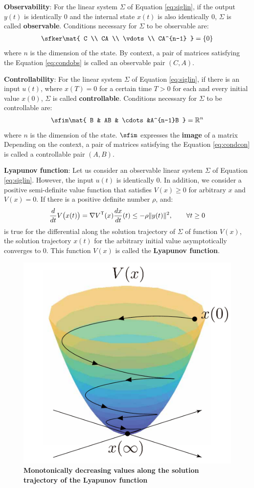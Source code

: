 \documentclass[graybox, envcountchap]{svmult}
\begin{document}
\begin{COLUMN}
\noindent \textbf{Observability}:
For the linear system $\Sigma$ of Equation \ref{eq:siglin}, if the output $y(t)$ is identically 0 and the internal state $x(t)$ is also identically 0, $\Sigma$ is called \textbf{observable}.
Conditions necessary for $\Sigma$ to be observable are:
\begin{align}\label{eq:condobs}
\sfker \mat{
C \\
CA \\
\vdots \\
CA^{n-1}
}
=\{0\}
\end{align}
where $n$ is the dimension of the state.
By context, a pair of matrices satisfying the Equation \ref{eq:condobs} is called an observable pair $(C,A)$.

\smallskip
\noindent \textbf{Controllability}:
For the linear system $\Sigma$ of Equation \ref{eq:siglin}, if there is an input $u(t)$, where $x(T) = 0$ for a certain time $T > 0$ for each and every initial value $x(0)$, $\Sigma$ is called \textbf{controllable}.
Conditions necessary for $\Sigma$ to be controllable are:
\begin{align}\label{eq:condcon}
\sfim \mat{
B & AB & \cdots &A^{n-1}B
}
= \mathbb{R}^n
\end{align}
where $n$ is the dimension of the state. $\sfim$ expresses the \textbf{image} of a matrix
Depending on the context, a pair of matrices satisfying the Equation \ref{eq:condcon} is called a controllable pair $(A,B)$.

\smallskip
\noindent \textbf{Lyapunov function}:
Let us consider an observable linear system $\Sigma$ of Equation
\ref{eq:siglin}. However, the input $u(t)$ is identically 0. In addition, we
consider a positive semi-definite value function that satisfies $V(x)\geq0$ for
arbitrary $x$ and $V(x)=0$. If there is a positive definite number $\rho$, and:
\[
\frac{d}{dt} V \bigl( x (t) \bigr) 
=
\nabla V^{\sf T}(x) \frac{d x}{dt} (t)
\leq  - \rho \|y(t)\|^2,\qquad
\forall t \geq0
\]
is true for the differential along the solution trajectory of $\Sigma$ of function $V(x)$, the solution trajectory $x(t)$ for the arbitrary initial value asymptotically converges to 0.
This function $V(x)$ is called the \textbf{Lyapunov function}.

\begin{figure}[h]
\centering
\includegraphics[width = .35\linewidth]{figs/cone}
\caption{\textbf{Monotonically decreasing values along the solution trajectory of the Lyapunov function}}
\label{fig:conelyap}
\medskip
\end{figure}



\end{COLUMN}
\end{document}

